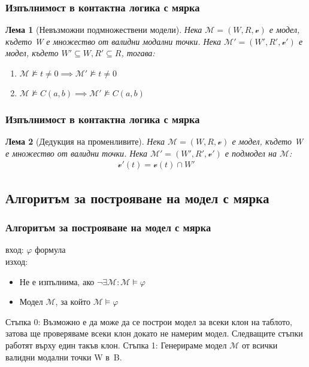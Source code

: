 \documentclass{beamer}
\newtheorem{lema}{Лема}[section]
\newcommand{\vE}{\mathscr{v}}
\begin{document}
\begin{frame}\frametitle{Изпълнимост в контактна логика с мярка}
\begin{lema}[Невъзможни подмножествени модели]
Нека $\mathcal{M} = (W, R, \vE)$ е модел, където W е множество от валидни модални точки.
Нека $\mathcal{M'} = (W', R', \vE')$ е модел, където $W' \subseteq W, R' \subseteq R$, тогава:
	\begin{enumerate}
		\item $\mathcal{M} \not\models t \neq 0 \implies \mathcal{M'} \not\models t \neq 0$
		\item $\mathcal{M} \not\models C(a,b) \implies \mathcal{M'} \not\models C(a,b)$
	\end{enumerate}
	\end{lema}
\end{frame}

\begin{frame}\frametitle{Изпълнимост в контактна логика с мярка}
	\begin{lema}[Дедукция на променливите]
		Нека $\mathcal{M} = (W, R, \vE)$ е модел, където W е множество от валидни точки.
		Нека $\mathcal{M'} = (W', R', \vE')$ е подмодел на $\mathcal{M}$:
		\begin{align*}
			\vE'(t) =  \vE(t) \cap W'
		\end{align*}
	\end{lema}
\end{frame}

\subsection{Алгоритъм за построяване на модел с мярка}
\begin{frame}\frametitle{Алгоритъм за построяване на модел с мярка}
	вход: $\varphi$ формула  \\
	изход: 
\begin{itemize}
	\item Не е изпълнима, ако $\neg \exists \mathcal{M}: \mathcal{M} \models \varphi$
	\item Модел $\mathcal{M}$, за който $\mathcal{M} \models \varphi$
\end{itemize}
\end{frame}

\begin{frame}
Стъпка 0:
\newline
Възможно е да може да се построи модел за всеки клон на таблото, затова ще проверяваме всеки клон докато не намерим модел.
\newline
Следващите стъпки работят върху един такъв клон.
\newline
\newline
Стъпка 1:
\newline
Генерираме модел $\mathcal{M}$ от всички валидни модални точки W в~B.
\end{frame}
\end{document}
